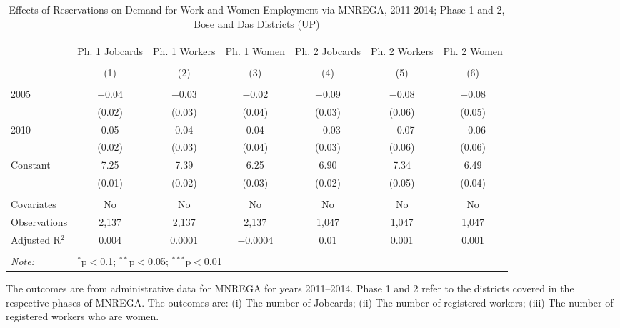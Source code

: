 \begin{sidewaystable}[!htbp]
\centering
\begin{threeparttable}

  \caption{Effects of Reservations on Demand for Work and Women Employment via MNREGA, 2011-2014;
          Phase 1 and 2, Bose and Das Districts (UP)} 
  \label{mnrega_main_up_bd} 
\scriptsize 
\begin{tabular}{@{\extracolsep{0pt}}lcccccc} 
\\[-1.8ex]\hline 
\hline \\[-1.8ex] 
 & Ph. 1 Jobcards & Ph. 1 Workers & Ph. 1 Women & Ph. 2 Jobcards & Ph. 2 Workers & Ph. 2 Women \\ 
\\[-1.8ex] & (1) & (2) & (3) & (4) & (5) & (6)\\ 
\hline \\[-1.8ex] 
 2005 & $-$0.04 & $-$0.03 & $-$0.02 & $-$0.09 & $-$0.08 & $-$0.08 \\ 
  & (0.02) & (0.03) & (0.04) & (0.03) & (0.06) & (0.05) \\ 
  2010 & 0.05 & 0.04 & 0.04 & $-$0.03 & $-$0.07 & $-$0.06 \\ 
  & (0.02) & (0.03) & (0.04) & (0.03) & (0.06) & (0.06) \\ 
  Constant & 7.25 & 7.39 & 6.25 & 6.90 & 7.34 & 6.49 \\ 
  & (0.01) & (0.02) & (0.03) & (0.02) & (0.05) & (0.04) \\ 
 \hline \\[-1.8ex] 
Covariates & No & No & No & No & No & No \\ 
Observations & 2,137 & 2,137 & 2,137 & 1,047 & 1,047 & 1,047 \\ 
Adjusted R$^{2}$ & 0.004 & 0.0001 & $-$0.0004 & 0.01 & 0.001 & 0.001 \\ 
\hline 
\hline \\[-1.8ex] 
\textit{Note:}  & \multicolumn{6}{l}{$^{*}$p$<$0.1; $^{**}$p$<$0.05; $^{***}$p$<$0.01} \\ 
\end{tabular} 
\begin{tablenotes}[flushleft]
\setlength{\itemindent}{0em}
\scriptsize
\item The outcomes are from administrative data for MNREGA for years 2011--2014. 
                     Phase 1 and 2 refer to the districts covered in the respective phases of MNREGA. The outcomes are: 
                     (i) The number of Jobcards; 
                     (ii) The number of registered workers;
                     (iii) The number of registered workers who are women.
\end{tablenotes}
\end{threeparttable}
\end{sidewaystable}
